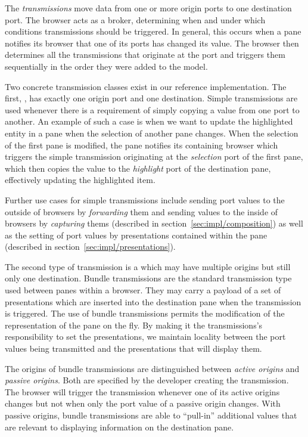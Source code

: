 \documentclass[a4paper,10pt,twoside]{book}
\begin{document}
The \emph{transmissions} move data from one or more origin ports to one destination port. The browser acts as a broker, determining when and under which conditions transmissions should be triggered. In general, this occurs when a pane notifies its browser that one of its ports has changed its value. The browser then determines all the transmissions that originate at the port and triggers them sequentially in the order they were added to the model.

Two concrete transmission classes exist in our reference implementation. The first, , has exactly one origin port and one destination. Simple transmissions are used whenever there is a requirement of simply copying a value from one port to another. An example of such a case is when we want to update the highlighted entity in a pane when the selection of another pane changes. When the selection of the first pane is modified, the pane notifies its containing browser which triggers the simple transmission originating at the \emph{selection} port of the first pane, which then copies the value to the \emph{highlight} port of the destination pane, effectively updating the highlighted item.

Further use cases for simple transmissions include sending port values to the outside of browsers by \emph{forwarding} them and sending values to the inside of browsers by \emph{capturing} thems (described in section~\ref{sec:impl/composition}) as well as the setting of port values by presentations contained within the pane (described in section~\ref{sec:impl/presentations}).

The second type of transmission is a  which may have multiple origins but still only one destination. Bundle transmissions are the standard transmission type used between panes within a browser. They may carry a payload of a set of presentations which are inserted into the destination pane when the transmission is triggered. The use of bundle transmissions permits the modification of the representation of the pane on the fly. By making it the transmissions's responsibility to set the presentations, we maintain locality between the port values being transmitted and the presentations that will display them.

The origins of bundle transmissions are distinguished between
\emph{active origins} and \emph{passive origins}. Both are specified
by the developer creating the transmission. The browser will trigger
the transmission whenever one of its active origins changes but not
when only the port value of a passive origin changes. With passive
origins, bundle transmissions are able to ``pull-in'' additional values
that are relevant to displaying information on the destination pane.
\end{document}
